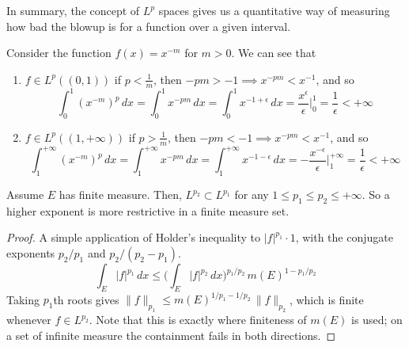 	In summary, the concept of $L^p$ spaces gives us a quantitative way of measuring how bad the blowup is for a function over a given interval. 

	\begin{example}[Integrability of $x^{-m}$]
		Consider the function $f(x) = x^{-m}$ for $m > 0$. We can see that 
		\begin{enumerate}
			\item $f \in L^p ((0, 1))$ if $p < \frac{1}{m}$, then $-pm > -1 \implies x^{-pm} < x^{-1}$, and so
				\begin{equation}
					\int_0^1 (x^{-m})^p \,dx = \int_0^1 x^{-pm} \,dx = \int_0^1 x^{-1 + \epsilon} \,dx = \frac{x^{\epsilon}}{\epsilon} \bigg|_0^1 = \frac{1}{\epsilon} < +\infty
				\end{equation}

			\item $f \in L^p ((1, +\infty))$ if $p > \frac{1}{m}$, then $-pm < -1 \implies x^{-pm} < x^{-1}$, and so
				\begin{equation}
					\int_1^{+\infty} (x^{-m})^p \,dx = \int_1^{+\infty} x^{-pm} \,dx = \int_1^{+\infty} x^{-1 - \epsilon} \,dx = -\frac{x^{-\epsilon}}{\epsilon} \bigg|_1^{+\infty} = \frac{1}{\epsilon} < +\infty
				\end{equation}
		\end{enumerate}
	\end{example}

  \begin{corollary}
    \label{thm:nesting-of-lp-spaces-on-a-finite-measure-space}
    Assume $E$ has finite measure. Then, $L^{p_2} \subset L^{p_1}$ for any $1 \leq p_1 \leq p_2 \leq +\infty$. So a higher exponent is more restrictive in a finite measure set. 
  \end{corollary}
  \begin{proof}
    A simple application of Holder's inequality to $|f|^{p_1} \cdot 1$, with the conjugate exponents $p_2 / p_1$ and $p_2 / (p_2 - p_1)$. 
    \begin{equation}
      \int_E |f|^{p_1} \,dx \leq \bigg( \int_E |f|^{p_2} \,dx \bigg)^{p_1/p_2} \, m(E)^{1 - p_1/p_2}
    \end{equation}
    Taking $p_1$th roots gives $\|f\|_{p_1} \leq m(E)^{1/p_1 - 1/p_2} \, \|f\|_{p_2}$, which is finite whenever $f \in L^{p_2}$. Note that this is exactly where finiteness of $m(E)$ is used; on a set of infinite measure the containment fails in both directions. 
  \end{proof}

